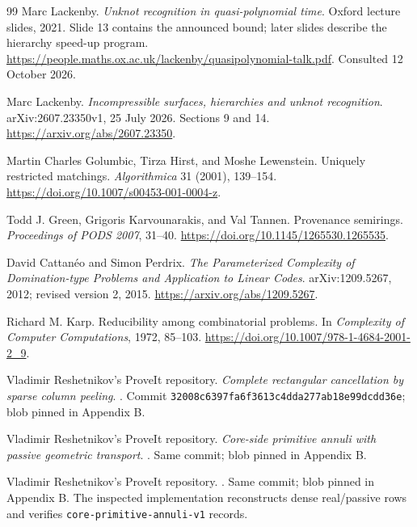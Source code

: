 \documentclass[11pt,letterpaper]{article}
\theoremstyle{definition}
\newcommand{\commit}{\texttt{32008c6397fa6f3613c4dda277ab18e99dcdd36e}}
\begin{document}
\begin{thebibliography}{99}
Marc Lackenby. \emph{Unknot recognition in quasi-polynomial time}. Oxford lecture slides, 2021. Slide 13 contains the announced bound; later slides describe the hierarchy speed-up program. \url{https://people.maths.ox.ac.uk/lackenby/quasipolynomial-talk.pdf}. Consulted 12 October 2026.

Marc Lackenby. \emph{Incompressible surfaces, hierarchies and unknot recognition}. arXiv:2607.23350v1, 25 July 2026. Sections 9 and 14. \url{https://arxiv.org/abs/2607.23350}.

Martin Charles Golumbic, Tirza Hirst, and Moshe Lewenstein. Uniquely restricted matchings. \emph{Algorithmica} 31 (2001), 139--154. \url{https://doi.org/10.1007/s00453-001-0004-z}.

Todd J. Green, Grigoris Karvounarakis, and Val Tannen. Provenance semirings. \emph{Proceedings of PODS 2007}, 31--40. \url{https://doi.org/10.1145/1265530.1265535}.

David Cattan\'eo and Simon Perdrix. \emph{The Parameterized Complexity of Domination-type Problems and Application to Linear Codes}. arXiv:1209.5267, 2012; revised version 2, 2015. \url{https://arxiv.org/abs/1209.5267}.

Richard M. Karp. Reducibility among combinatorial problems. In \emph{Complexity of Computer Computations}, 1972, 85--103. \url{https://doi.org/10.1007/978-1-4684-2001-2_9}.

Vladimir Reshetnikov's ProveIt repository. \emph{Complete rectangular cancellation by sparse column peeling}. . Commit \commit; blob pinned in Appendix B.

Vladimir Reshetnikov's ProveIt repository. \emph{Core-side primitive annuli with passive geometric transport}. . Same commit; blob pinned in Appendix B.

Vladimir Reshetnikov's ProveIt repository. . Same commit; blob pinned in Appendix B. The inspected implementation reconstructs dense real/passive rows and verifies \texttt{core-primitive-annuli-v1} records.
\end{thebibliography}
\end{document}
